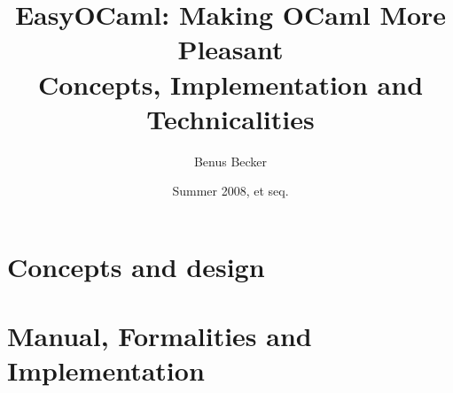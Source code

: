 \documentclass[11pt,titlepage,abstracton]{scrartcl} %
\title{EasyOCaml: Making OCaml More Pleasant \large \\[0.5em]
Concepts, Implementation and Technicalities}
\author{Benus Becker}
\date{Summer 2008, et seq.}
\begin{document}



\clearpage \part{Concepts and design} \label{part:concepts}




\clearpage \part{Manual, Formalities and Implementation} \label{part:implem}





\clearpage
\end{document}
